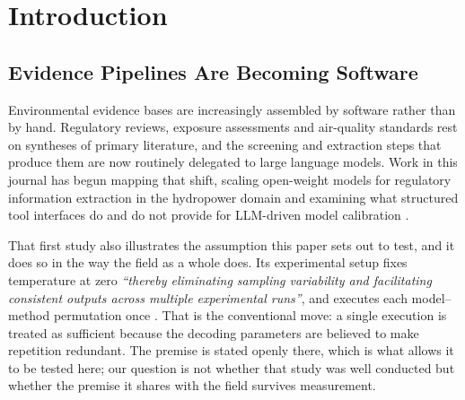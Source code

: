 \documentclass[preprint,review,12pt,authoryear]{elsarticle}
\begin{document}
\section{Introduction}

\subsection{Evidence Pipelines Are Becoming Software}

Environmental evidence bases are increasingly assembled by software rather than by hand. Regulatory reviews, exposure assessments and air-quality standards rest on syntheses of primary literature, and the screening and extraction steps that produce them are now routinely delegated to large language models. Work in this journal has begun mapping that shift, scaling open-weight models for regulatory information extraction in the hydropower domain \citep{yoon2026hydropower} and examining what structured tool interfaces do and do not provide for LLM-driven model calibration \citep{park2026toolinterfaces}.

That first study also illustrates the assumption this paper sets out to test, and it does so in the way the field as a whole does. Its experimental setup fixes temperature at zero \emph{``thereby eliminating sampling variability and facilitating consistent outputs across multiple experimental runs''}, and executes each model--method permutation once \citep{yoon2026hydropower}. That is the conventional move: a single execution is treated as sufficient because the decoding parameters are believed to make repetition redundant. The premise is stated openly there, which is what allows it to be tested here; our question is not whether that study was well conducted but whether the premise it shares with the field survives measurement.
\end{document}
